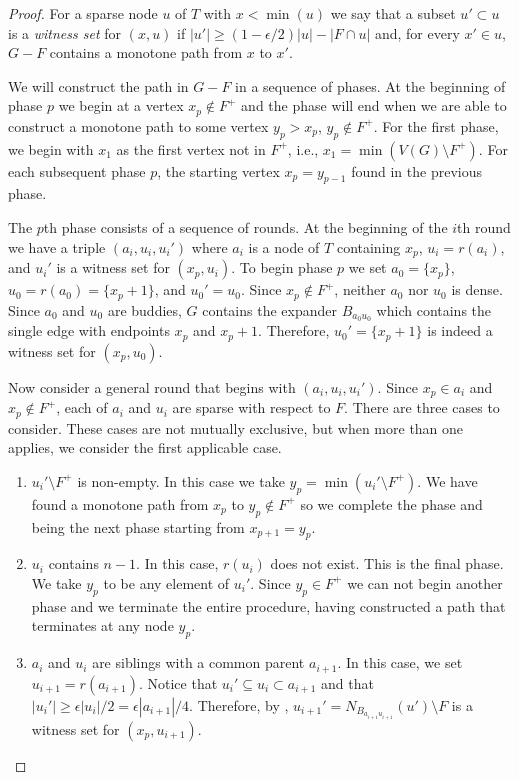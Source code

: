 \documentclass{patmorin}
\begin{document}
\begin{proof}
  For a sparse node $u$ of $T$ with $x<\min(u)$ we say that a subset
  $u'\subset u$ is a \emph{witness set} for $(x,u)$ if $|u'|\ge
  (1-\epsilon/2)|u|-|F\cap u|$ and, for every $x'\in u$, $G-F$ contains
  a monotone path from $x$ to $x'$.

  We will construct the path in $G-F$ in a sequence of phases. At
  the beginning of phase $p$ we begin at a vertex $x_p\not\in F^+$
  and the phase will end when we are able to construct a monotone path to some
  vertex $y_p>x_p$, $y_p\not\in F^+$.  For the first phase, we begin with $x_1$
  as the first vertex not in $F^+$, i.e., $x_1=\min(V(G)\setminus F^+)$.
  For each subsequent phase $p$, the starting vertex $x_p=y_{p-1}$ found
  in the previous phase.

  The $p$th phase consists of a sequence of rounds. At the beginning of
  the $i$th round we have a triple $(a_i,u_i,u_i')$ where $a_i$ is a
  node of $T$ containing $x_p$, $u_i=r(a_i)$, and $u_i'$ is a witness
  set for $(x_p,u_i)$.  To begin phase $p$ we set $a_0=\{x_p\}$,
  $u_0=r(a_0)=\{x_p+1\}$, and $u_0'=u_0$.  Since $x_p\not\in F^+$,
  neither $a_0$ nor $u_0$ is dense.  Since $a_0$ and $u_0$ are buddies,
  $G$ contains the expander $B_{a_0u_0}$ which contains the single
  edge with endpoints $x_p$ and $x_p+1$.  Therefore, $u_0'=\{x_p+1\}$
  is indeed a witness set for $(x_p,u_0)$.

  Now consider a general round that begins with $(a_i,u_i,u_i')$.
  Since $x_p\in a_i$ and $x_p\not\in F^+$, each of $a_i$ and $u_i$ are
  sparse with respect to $F$. There are three cases to consider. These
  cases are not mutually exclusive, but when more than one applies,
  we consider the first applicable case.
  \begin{enumerate}
   \item $u_i'\setminus F^+$ is non-empty. In this case we take
    $y_p=\min(u_i'\setminus F^+)$. We have found a monotone
    path from $x_p$ to $y_p\not\in F^+$ so we complete the phase and
    being the next phase starting from $x_{p+1}=y_p$.

    \item $u_i$ contains $n-1$.  In this case, $r(u_i)$ does not exist.
    This is the final phase.  We take $y_p$ to be any element of $u_i'$.
    Since $y_p\in F^+$ we can not begin another phase and we terminate
    the entire procedure, having constructed a path that terminates at
    any node $y_p$.

    \item $a_i$ and $u_i$ are siblings with a common
    parent $a_{i+1}$.  In this case, we set $u_{i+1}=r(a_{i+1})$.
    Notice that $u_i'\subseteq u_{i}\subset a_{i+1}$ and that
    $|u_i'|\ge \epsilon|u_i|/2 = \epsilon|a_{i+1}|/4$.  Therefore, by
    , $u_{i+1}'= N_{B_{a_{i+1}u_{i+1}}}(u')\setminus F$
    is a witness set for $(x_p,u_{i+1})$.


\end{enumerate}
\end{proof}
\end{document}
